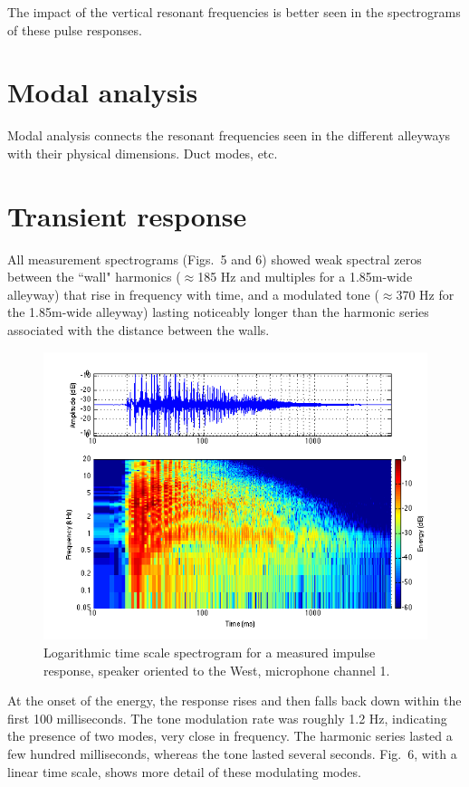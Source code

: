 \documentclass{aes137}
\begin{document}
The impact of the vertical resonant frequencies is better seen in the
spectrograms of these pulse responses.

\section{Modal analysis}

Modal analysis connects the resonant frequencies seen in the different
alleyways with their physical dimensions. Duct modes, etc.

\section{Transient response}

All measurement spectrograms (Figs.~5 and 6) showed weak spectral
zeros between the ``wall" harmonics ($\approx$185 Hz and multiples for
a 1.85m-wide alleyway) that rise in frequency with time, and a
modulated tone ($\approx$370 Hz for the 1.85m-wide alleyway) lasting
noticeably longer than the harmonic series associated with the
distance between the walls.

\begin{figure}[h] \centering \includegraphics[width=\linewidth, trim=10mm 5mm 2mm 7mm, clip]{images/logspectrogram.png} 
\caption{Logarithmic time scale spectrogram for a measured impulse
  response, speaker oriented to the West, microphone channel 1.}
\end{figure}

At the onset of the energy, the response rises and then falls back
down within the first 100 milliseconds. The tone modulation rate was
roughly 1.2 Hz, indicating the presence of two modes, very close in
frequency. The harmonic series lasted a few hundred milliseconds,
whereas the tone lasted several seconds. Fig.~6, with a linear time
scale, shows more detail of these modulating modes.
\end{document}
